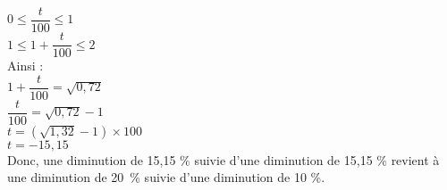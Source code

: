 $ 0 \leq \dfrac{t}{100} \leq 1 $ \\

$ 1 \leq 1 + \dfrac{t}{100} \leq 2 $ \\

Ainsi : \\

$1 + \dfrac{t}{100} = \sqrt{0,72} $ \\

$\dfrac{t}{100} = \sqrt{0,72} - 1 $ \\

$ t = \left(\sqrt{1,32} - 1 \right) \times 100 $ \\

$ t = -15,15 $ \\

Donc, une diminution de 15,15 \% suivie d'une diminution de 15,15 \% revient à une diminution de 20~\% suivie d'une diminution de 10 \%. 
